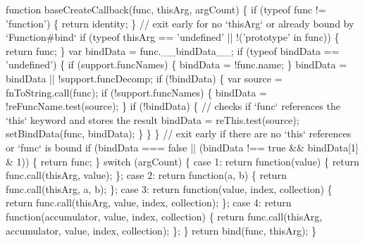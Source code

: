 \begin{DoxyCodeInclude}
    \textcolor{keyword}{function} baseCreateCallback(func, thisArg, argCount) \{
      \textcolor{keywordflow}{if} (typeof func != \textcolor{stringliteral}{'function'}) \{
        \textcolor{keywordflow}{return} identity;
      \}
      \textcolor{comment}{// exit early for no `thisArg` or already bound by `Function#bind`}
      \textcolor{keywordflow}{if} (typeof thisArg == \textcolor{stringliteral}{'undefined'} || !(\textcolor{stringliteral}{'prototype'} in func)) \{
        \textcolor{keywordflow}{return} func;
      \}
      var bindData = func.\_\_bindData\_\_;
      \textcolor{keywordflow}{if} (typeof bindData == \textcolor{stringliteral}{'undefined'}) \{
        \textcolor{keywordflow}{if} (support.funcNames) \{
          bindData = !func.name;
        \}
        bindData = bindData || !support.funcDecomp;
        \textcolor{keywordflow}{if} (!bindData) \{
          var source = fnToString.call(func);
          \textcolor{keywordflow}{if} (!support.funcNames) \{
            bindData = !reFuncName.test(source);
          \}
          \textcolor{keywordflow}{if} (!bindData) \{
            \textcolor{comment}{// checks if `func` references the `this` keyword and stores the result}
            bindData = reThis.test(source);
            setBindData(func, bindData);
          \}
        \}
      \}
      \textcolor{comment}{// exit early if there are no `this` references or `func` is bound}
      \textcolor{keywordflow}{if} (bindData === \textcolor{keyword}{false} || (bindData !== \textcolor{keyword}{true} && bindData[1] & 1)) \{
        \textcolor{keywordflow}{return} func;
      \}
      \textcolor{keywordflow}{switch} (argCount) \{
        \textcolor{keywordflow}{case} 1: \textcolor{keywordflow}{return} \textcolor{keyword}{function}(value) \{
          \textcolor{keywordflow}{return} func.call(thisArg, value);
        \};
        \textcolor{keywordflow}{case} 2: \textcolor{keywordflow}{return} \textcolor{keyword}{function}(a, b) \{
          \textcolor{keywordflow}{return} func.call(thisArg, a, b);
        \};
        \textcolor{keywordflow}{case} 3: \textcolor{keywordflow}{return} \textcolor{keyword}{function}(value, index, collection) \{
          \textcolor{keywordflow}{return} func.call(thisArg, value, index, collection);
        \};
        \textcolor{keywordflow}{case} 4: \textcolor{keywordflow}{return} \textcolor{keyword}{function}(accumulator, value, index, collection) \{
          \textcolor{keywordflow}{return} func.call(thisArg, accumulator, value, index, collection);
        \};
      \}
      \textcolor{keywordflow}{return} bind(func, thisArg);
    \}


\end{DoxyCodeInclude}
